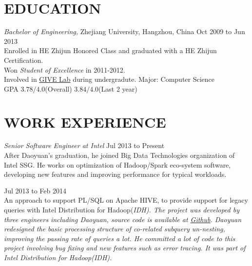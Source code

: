 \documentclass[line,margin]{res}
\begin{document}
\address{Cellphone:\sl +86-152-1686-1267}
\address{E-mail:\sl me at daoyuan.wang}


\begin{resume}

\section{EDUCATION} {\sl Bachelor of Engineering,} Zhejiang University, Hangzhou, China \hfill Oct 2009 to Jun 2013\\
                Enrolled in HE Zhijun Honored Class and graduated with a HE Zhijun Certification.\\
                Won {\sl Student of Excellence} in 2011-2012.\\
                Involved in \href{http://give.zju.edu.cn/en/portal/index.html}{GIVE Lab} during undergradute.
                Major: Computer Science \\
                GPA $3.78/4.0$(Overall) $3.84/4.0$(Last 2 year)

\section{WORK EXPERIENCE}
    {\sl Senior Software Engineer at Intel} \hfill         Jul 2013 to Present\\
    After Daoyuan's graduation, he joined Big Data Technologies organization of Intel SSG. He works on optimization of Hadoop/Spark eco-system software, developing new features and improving performance for typical workloads.
        \begin{outline}
             \hfill        Jul 2013 to Feb 2014\\
                An approach to support PL/SQL on Apache HIVE, to provide support for legacy queries with Intel Distribution for Hadoop(\sl IDH). The project was developed by three engineers including Daoyuan, source code is available at \href{https://github.com/intel-hadoop/project-panthera}{Github}. Daoyuan redesigned the basic processing structure of co-related subquery un-nesting, improving the passing rate of queries a lot. He committed a lot of code to this project involving bug fixing and new features such as error tracing. It was part of Intel Distribution for Hadoop(\sl IDH).


\end{outline}
\end{resume}
\end{document}
